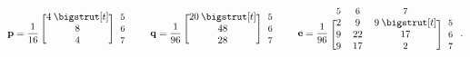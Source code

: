 \begin{align}
	\mathbf{p} =  \frac{1}{16} \, \begin{blockarray}{*{1}{c} l}
	\begin{block}{[*{1}{c}]>{$\footnotesize}l<{$}}
	4 \: \bigstrut[t]& 5\\
	8 & 6 \\
	4 & 7 \\
	\end{block}
	\end{blockarray}
	\qquad
	\mathbf{q} =  \frac{1}{96} \, \begin{blockarray}{*{1}{c} l}
	\begin{block}{[*{1}{c}]>{$\footnotesize}l<{$}}
	20 \: \bigstrut[t]& 5\\
	48 & 6 \\
	28 & 7 \\
	\end{block}
	\end{blockarray}
	\qquad	
	\mathbf{e} = \frac{1}{96}\: \begin{blockarray}{*{3}{c} l}
	\begin{block}{*{3}{>{$\footnotesize}c<{$}} l}
	5 & 6 & 7 \\
	\end{block}
	\begin{block}{[*{3}{c}]>{$\footnotesize}l<{$}}
	2 & 9 & 9 \: \bigstrut[t]& 5\\
	9 & 22 & 17 & 6 \\
	9 & 17 & 2 & 7\\
	\end{block}
	\end{blockarray} \, .
\end{align}

